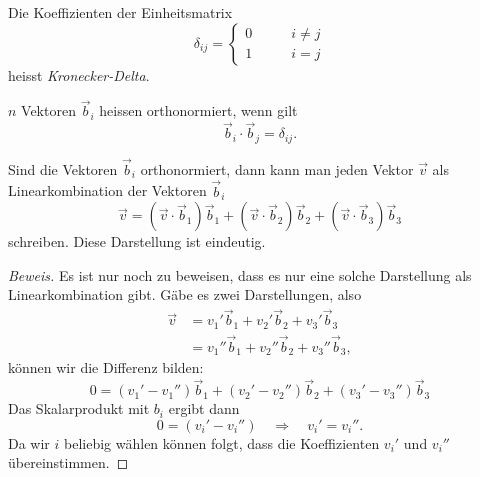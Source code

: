 \begin{definition} Die Koeffizienten der Einheitsmatrix
\[
\delta_{ij}=
\begin{cases}
0&\qquad i\ne j\\
1&\qquad i=j
\end{cases}
\]
heisst {\em Kronecker-Delta}.
\end{definition}

\begin{definition}
$n$ Vektoren $\vec b_i$ heissen orthonormiert, wenn gilt
\[
\vec b_i\cdot\vec b_j=\delta_{ij}.
\]
\end{definition}

\begin{satz}
Sind die Vektoren $\vec b_i$ orthonormiert, dann kann man jeden
Vektor $\vec v$ als Linearkombination der Vektoren $\vec b_i$
\[
\vec v=
(\vec v\cdot\vec b_1)\vec b_1
+
(\vec v\cdot\vec b_2)\vec b_2
+
(\vec v\cdot\vec b_3)\vec b_3
\]
schreiben.
Diese Darstellung ist eindeutig.
\end{satz}

\begin{proof}[Beweis]
Es ist nur noch zu beweisen, dass es nur eine solche Darstellung als
Linearkombination gibt.
Gäbe es zwei Darstellungen, also
\begin{align*}
\vec v
&=
v_1'\vec b_1+
v_2'\vec b_2+
v_3'\vec b_3\\
&=
v_1''\vec b_1+
v_2''\vec b_2+
v_3''\vec b_3,
\end{align*}
können wir die Differenz bilden:
\[
0=
(v_1'-v_1'')\vec b_1
+
(v_2'-v_2'')\vec b_2
+
(v_3'-v_3'')\vec b_3
\]
Das Skalarprodukt mit $b_i$ ergibt dann
\[
0=(v_i'-v_i'')\quad\Rightarrow\quad v_i'=v_i''.
\]
Da wir $i$ beliebig wählen können folgt, dass die
Koeffizienten $v_i'$ und $v_i''$ übereinstimmen.
\end{proof}



